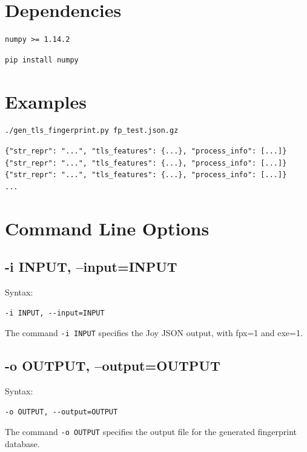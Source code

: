 \documentclass{book}
\begin{document}
\section{Dependencies}

\begin{mdframed}[style=cli]
\begin{verbatim}
numpy >= 1.14.2
\end{verbatim}
\end{mdframed}

\begin{mdframed}[style=cli]
\begin{verbatim}
pip install numpy
\end{verbatim}
\end{mdframed}


\section{Examples}

\begin{mdframed}[style=cli]
\begin{verbatim}
./gen_tls_fingerprint.py fp_test.json.gz
\end{verbatim}
\begin{verbatim}
{"str_repr": "...", "tls_features": {...}, "process_info": [...]}
{"str_repr": "...", "tls_features": {...}, "process_info": [...]}
{"str_repr": "...", "tls_features": {...}, "process_info": [...]}
...
\end{verbatim}
\end{mdframed}

\section{Command Line Options}

\subsection{-i INPUT, --input=INPUT}
\begin{mdframed}[style=aaa]
Syntax:
  \begin{verbatim}
-i INPUT, --input=INPUT
  \end{verbatim}
\end{mdframed}
The command \texttt{-i INPUT} specifies the Joy JSON output, with fpx=1 and exe=1.

\subsection{-o OUTPUT, --output=OUTPUT}
\begin{mdframed}[style=aaa]
Syntax:
  \begin{verbatim}
-o OUTPUT, --output=OUTPUT
  \end{verbatim}
\end{mdframed}
The command \texttt{-o OUTPUT} specifies the output file for the generated fingerprint database.
\end{document}
